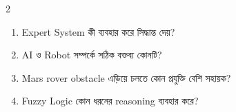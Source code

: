 \begin{practicebox}
\begin{multicols}{2}
\begin{enumerate}
\item \begin{minipage}[t]{\linewidth}Expert System কী ব্যবহার করে সিদ্ধান্ত দেয়?\par {}\par\end{minipage}

\item \begin{minipage}[t]{\linewidth}AI ও Robot সম্পর্কে সঠিক বক্তব্য কোনটি?\par {}\par\end{minipage}

\item \begin{minipage}[t]{\linewidth}Mars rover obstacle এড়িয়ে চলতে কোন প্রযুক্তি বেশি সহায়ক?\par {}\par\end{minipage}

\item \begin{minipage}[t]{\linewidth}Fuzzy Logic কোন ধরনের reasoning ব্যবহার করে?\par {}\par\end{minipage}
\end{enumerate}\end{multicols}


\end{practicebox}
